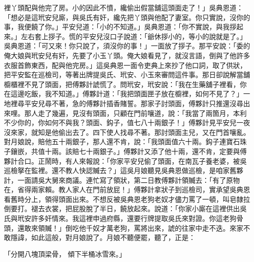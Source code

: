 \begin{showcontents}{}
裡丫頭配與他完了房。小的因此不憤，纔偷出假當舖這頭面走了！」吳典恩道：「想必是這玳安兒廝，與吳氏有奸，纔先把丫頭與他配了妻室。你只實說，沒你的事，我便饒了你。」平安兒道：「小的不知道。」吳典恩道：「你不實說，與我拶起來。」左右套上拶子。慌的平安兒沒口子說道：「爺休拶小的，等小的說就是了。」吳典恩道：「可又來！你只說了，須沒你的事！」一面放了拶子。那平安說：「委的俺大娘與玳安兒有奸，先要了小玉丫頭。俺大娘看見了，就沒言語，倒與了他許多衣服首飾東西，配與他完房。」這吳典恩一面令吏典上來抄了他口詞，取了供狀，把平安監在巡檢司，等著出牌提吳氏、玳安、小玉來審問這件事。那日卻說解當舖櫥櫃裡不見了頭面，把傅夥計諕慌了。問玳安，玳安說：「我在生藥舖子裡看，你在這邊吃飯，我不知道。」傅夥計道：「我把頭面匣子放在櫥裡，如何不見了？」一地裡尋平安兒尋不著，急的傅夥計插香賭誓。那家子討頭面，傅夥計只推還沒尋出來哩。那人走了幾遍，見沒有頭面，只顧在門前嚷道，說：「我當了兩箇月，本利不少你的，你如何不與我？頭面、鈎子，值七八十兩銀子！」傅夥計見平安兒一夜沒來家，就知是他偷出去了。四下使人找尋不著。那討頭面主兒，又在門首嚷亂。對月娘說，賠他五十兩銀子，那人還不肯，說：「我頭面值六十兩。鈎子連寶石珠子鑲嵌，共值十兩。該賠七十兩銀子。」傅夥計又添了他十兩，還不肯，定要與傅夥計合口。正鬧時，有人來報說：「你家平安兒偷了頭面，在南瓦子養老婆，被吳巡檢拏在監裡。還不教人快認贓去？」這吳月娘聽見吳典恩做巡檢，是咱家舊夥計，一面請吳大舅來商議。連忙寫了領狀，第二日教傅夥計領贓去：「有了原物在，省得兩家賴。教人家人在門前放屁！」傅夥計拿狀子到巡檢司，實承望吳典恩看舊時分上，領得頭面出來。不想反被吳典恩老狗老奴才儘力罵了一頓，叫皂隸拉倒要打。褪去衣裳，把屁股脫了半日，饒放起來。說道：「你家小廝在這裡供出吳氏與玳安許多奸情來。我這裡申過府縣，還要行牌提取吳氏來對證。你這老狗骨頭，還敢來領贓！」倒吃他千奴才萬老狗，罵將出來，諕的往家中走不迭。來家不敢隱諱，如此這般，對月娘說了。月娘不聽便罷，聽了，正是：

「分開八塊頂梁骨，  傾下半桶冰雪來。」


\end{showcontents}
